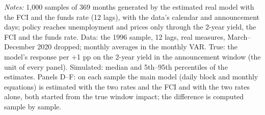 \begin{table}[tp]
\begin{flushleft}\footnotesize\textit{Notes:} 1,000 samples of 369 months generated by the estimated real model with the FCI and the funds rate (12 lags), with the data's calendar and announcement days; policy reaches unemployment and prices only through the 2-year yield, the FCI and the funds rate. Data: the 1996 sample, 12 lags, real measures, March--December 2020 dropped; monthly averages in the monthly VAR. True: the model's response per +1 pp on the 2-year yield in the announcement window (the unit of every panel). Simulated: median and 5th--95th percentiles of the estimates. Panels D--F: on each sample the main model (daily block and monthly equations) is estimated with the two rates and the FCI and with the two rates alone, both started from the true window impact; the difference is computed sample by sample.\end{flushleft}
\end{table}

